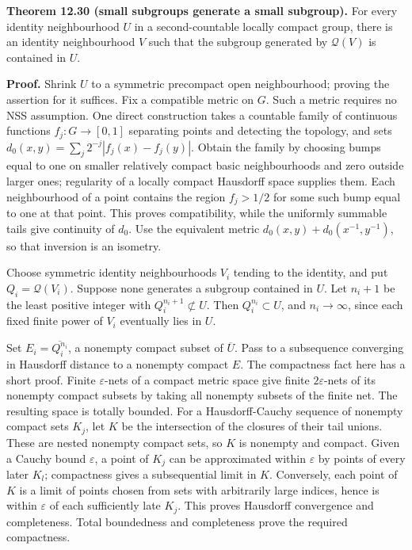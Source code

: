 \documentclass[
  11pt,
]{article}
\begin{document}
\textbf{Theorem 12.30 (small subgroups generate a small subgroup).} For
every identity neighbourhood \(U\) in a second-countable locally compact
group, there is an identity neighbourhood \(V\) such that the subgroup
generated by \(\mathcal Q(V)\) is contained in \(U\).

\textbf{Proof.} Shrink \(U\) to a symmetric precompact open
neighbourhood; proving the assertion for it suffices. Fix a compatible
metric on \(G\). Such a metric requires no NSS assumption. One direct
construction takes a countable family of continuous functions
\(f_j:G\to[0,1]\) separating points and detecting the topology, and sets
\(d_0(x,y)=\sum_j2^{-j}|f_j(x)-f_j(y)|\). Obtain the family by choosing
bumps equal to one on smaller relatively compact basic neighbourhoods
and zero outside larger ones; regularity of a locally compact Hausdorff
space supplies them. Each neighbourhood of a point contains the region
\(f_j>1/2\) for some such bump equal to one at that point. This proves
compatibility, while the uniformly summable tails give continuity of
\(d_0\). Use the equivalent metric \(d_0(x,y)+d_0(x^{-1},y^{-1})\), so
that inversion is an isometry.

Choose symmetric identity neighbourhoods \(V_i\) tending to the
identity, and put \(Q_i=\mathcal Q(V_i)\). Suppose none generates a
subgroup contained in \(U\). Let \(n_i+1\) be the least positive integer
with \(Q_i^{n_i+1}\not\subset U\). Then \(Q_i^{n_i}\subset U\), and
\(n_i\to\infty\), since each fixed finite power of \(V_i\) eventually
lies in \(U\).

Set \(E_i=\overline{Q_i^{n_i}}\), a nonempty compact subset of
\(\overline U\). Pass to a subsequence converging in Hausdorff distance
to a nonempty compact \(E\). The compactness fact here has a short
proof. Finite \(\varepsilon\)-nets of a compact metric space give finite
\(2\varepsilon\)-nets of its nonempty compact subsets by taking all
nonempty subsets of the finite net. The resulting space is totally
bounded. For a Hausdorff-Cauchy sequence of nonempty compact sets
\(K_j\), let \(K\) be the intersection of the closures of their tail
unions. These are nested nonempty compact sets, so \(K\) is nonempty and
compact. Given a Cauchy bound \(\varepsilon\), a point of \(K_j\) can be
approximated within \(\varepsilon\) by points of every later \(K_l\);
compactness gives a subsequential limit in \(K\). Conversely, each point
of \(K\) is a limit of points chosen from sets with arbitrarily large
indices, hence is within \(\varepsilon\) of each sufficiently late
\(K_j\). This proves Hausdorff convergence and completeness. Total
boundedness and completeness prove the required compactness.
\end{document}
